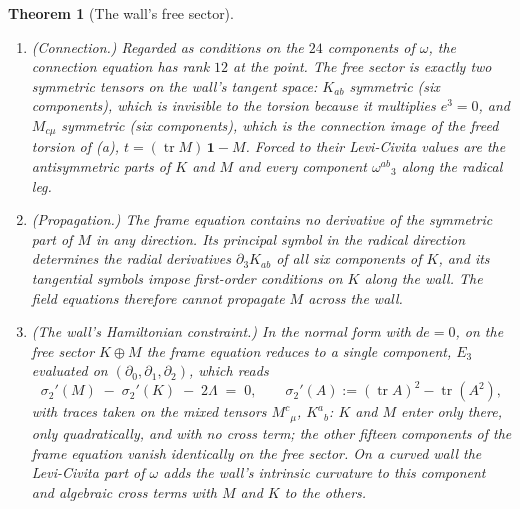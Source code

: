 \documentclass[11pt]{article}
\newtheorem{theorem}{Theorem}[section]
\theoremstyle{definition}
\theoremstyle{plain}
\begin{document}
\begin{theorem}[The wall's free sector]
\begin{enumerate}
\item[(b)] \emph{(Connection.)} Regarded as conditions on the $24$ components of $\omega$, the connection equation has rank $12$ at the point. The free sector is exactly two symmetric tensors on the wall's tangent space: $K_{ab}$ symmetric (six components), which is invisible to the torsion because it multiplies $e^3 = 0$, and $M_{c\mu}$ symmetric (six components), which is the connection image of the freed torsion of (a), $t = (\operatorname{tr}M)\,\mathbf{1} - M$. Forced to their Levi-Civita values are the antisymmetric parts of $K$ and $M$ and every component $\omega^{ab}{}_{3}$ along the radical leg.
\item[(c)] \emph{(Propagation.)} The frame equation contains no derivative of the symmetric part of $M$ in any direction. Its principal symbol in the radical direction determines the radial derivatives $\partial_3 K_{ab}$ of all six components of $K$, and its tangential symbols impose first-order conditions on $K$ along the wall. The field equations therefore cannot propagate $M$ across the wall.
\item[(d)] \emph{(The wall's Hamiltonian constraint.)} In the normal form with $de = 0$, on the free sector $K \oplus M$ the frame equation reduces to a single component, $E_3$ evaluated on $(\partial_0, \partial_1, \partial_2)$, which reads
\[
\sigma_2'(M) \;-\; \sigma_2'(K) \;-\; 2\Lambda \;=\; 0, \qquad \sigma_2'(A) := (\operatorname{tr}A)^2 - \operatorname{tr}(A^2),
\]
with traces taken on the mixed tensors $M^{c}{}_{\mu}$, $K^{a}{}_{b}$: $K$ and $M$ enter only there, only quadratically, and with no cross term; the other fifteen components of the frame equation vanish identically on the free sector. On a curved wall the Levi-Civita part of $\omega$ adds the wall's intrinsic curvature to this component and algebraic cross terms with $M$ and $K$ to the others.
\end{enumerate}

\end{theorem}
\end{document}
